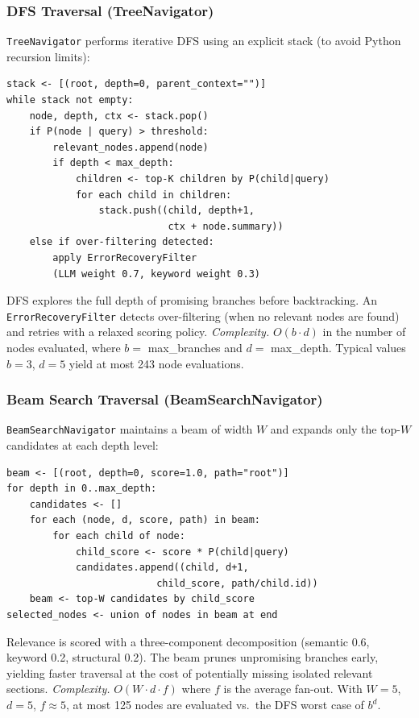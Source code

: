 \documentclass[sigconf,review,anonymous]{acmart}
\begin{document}
\subsubsection{DFS Traversal (TreeNavigator)}
\texttt{TreeNavigator} performs iterative DFS using an explicit stack (to avoid
Python recursion limits):
\begin{lstlisting}
stack <- [(root, depth=0, parent_context="")]
while stack not empty:
    node, depth, ctx <- stack.pop()
    if P(node | query) > threshold:
        relevant_nodes.append(node)
        if depth < max_depth:
            children <- top-K children by P(child|query)
            for each child in children:
                stack.push((child, depth+1,
                            ctx + node.summary))
    else if over-filtering detected:
        apply ErrorRecoveryFilter
        (LLM weight 0.7, keyword weight 0.3)
\end{lstlisting}
DFS explores the full depth of promising branches before backtracking. An
\texttt{ErrorRecoveryFilter} detects over-filtering (when no relevant nodes are
found) and retries with a relaxed scoring policy. \emph{Complexity.} $O(b\cdot
d)$ in the number of nodes evaluated, where $b=$ max\_branches and $d=$
max\_depth. Typical values $b=3$, $d=5$ yield at most 243 node evaluations.

\subsubsection{Beam Search Traversal (BeamSearchNavigator)}
\texttt{BeamSearchNavigator} maintains a beam of width $W$ and expands only the
top-$W$ candidates at each depth level:
\begin{lstlisting}
beam <- [(root, depth=0, score=1.0, path="root")]
for depth in 0..max_depth:
    candidates <- []
    for each (node, d, score, path) in beam:
        for each child of node:
            child_score <- score * P(child|query)
            candidates.append((child, d+1,
                          child_score, path/child.id))
    beam <- top-W candidates by child_score
selected_nodes <- union of nodes in beam at end
\end{lstlisting}
Relevance is scored with a three-component decomposition (semantic 0.6, keyword
0.2, structural 0.2). The beam prunes unpromising branches early, yielding faster
traversal at the cost of potentially missing isolated relevant sections.
\emph{Complexity.} $O(W\cdot d\cdot f)$ where $f$ is the average fan-out. With
$W=5$, $d=5$, $f\approx 5$, at most 125 nodes are evaluated vs.\ the DFS worst
case of $b^d$.
\end{document}
